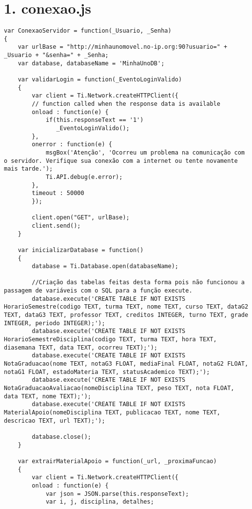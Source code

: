\section*{1. conexao.js}
\begin{lstlisting}
var ConexaoServidor = function(_Usuario, _Senha)
{
	var urlBase = "http://minhaunomovel.no-ip.org:90?usuario=" + _Usuario + "&senha=" + _Senha;	
	var database, databaseName = 'MinhaUnoDB';
		
 	var validarLogin = function(_EventoLoginValido)
 	{
 		var client = Ti.Network.createHTTPClient({
     	// function called when the response data is available
    	onload : function(e) {
     		if(this.responseText == '1')
     		   _EventoLoginValido();			         			
    	},
     	onerror : function(e) {
     		msgBox('Atenção', 'Ocorreu um problema na comunicação com o servidor. Verifique sua conexão com a internet ou tente novamente mais tarde.');
         	Ti.API.debug(e.error);
    	},
     	timeout : 50000 
 		});
 	
		client.open("GET", urlBase);
 		client.send();  
 	}
 	
 	var inicializarDatabase = function()
 	{
		database = Ti.Database.open(databaseName);
		
		//Criação das tabelas feitas desta forma pois não funcionou a passagem de variáveis com o SQL para a função execute.
		database.execute('CREATE TABLE IF NOT EXISTS HorarioSemestre(codigo TEXT, turma TEXT, nome TEXT, curso TEXT, dataG2 TEXT, dataG3 TEXT, professor TEXT, creditos INTEGER, turno TEXT, grade INTEGER, periodo INTEGER);');
		database.execute('CREATE TABLE IF NOT EXISTS HorarioSemestreDisciplina(codigo TEXT, turma TEXT, hora TEXT, diasemana TEXT, data TEXT, ocorreu TEXT);');
		database.execute('CREATE TABLE IF NOT EXISTS NotaGraduacao(nome TEXT, notaG3 FLOAT, mediaFinal FLOAT, notaG2 FLOAT, notaG1 FLOAT, estadoMateria TEXT, statusAcademico TEXT);');
		database.execute('CREATE TABLE IF NOT EXISTS NotaGraduacaoAvaliacao(nomeDisciplina TEXT, peso TEXT, nota FLOAT, data TEXT, nome TEXT);');
		database.execute('CREATE TABLE IF NOT EXISTS MaterialApoio(nomeDisciplina TEXT, publicacao TEXT, nome TEXT, descricao TEXT, url TEXT);');
		
		database.close();
 	}
 	
 	var extrairMaterialApoio = function(_url, _proximaFuncao)
 	{
 		var client = Ti.Network.createHTTPClient({
    	onload : function(e) {
     		var json = JSON.parse(this.responseText);
			var i, j, disciplina, detalhes;
			

\end{lstlisting}
